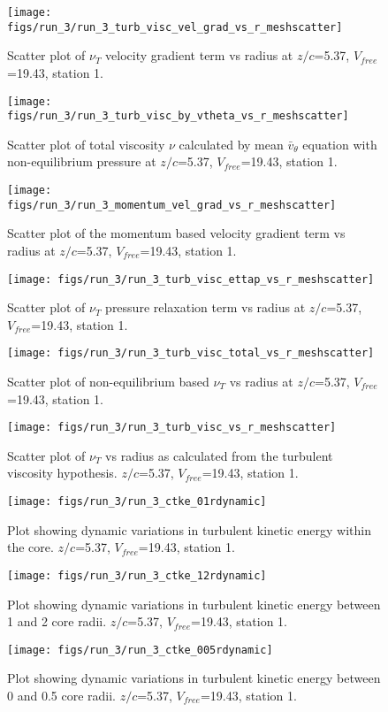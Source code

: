 \begin{figure}[H]
\centering
\texttt{[image: figs/run\_3/run\_3\_turb\_visc\_vel\_grad\_vs\_r\_meshscatter]}
\caption{Scatter plot of $\nu_T$ velocity gradient term vs radius at $z/c$=5.37, $V_{free}$=19.43, station 1.}
\end{figure}


\begin{figure}[H]
\centering
\texttt{[image: figs/run\_3/run\_3\_turb\_visc\_by\_vtheta\_vs\_r\_meshscatter]}
\caption{Scatter plot of total viscosity $\nu$ calculated by mean $\bar{v}_{\theta}$ equation with non-equilibrium pressure at $z/c$=5.37, $V_{free}$=19.43, station 1.}
\end{figure}


\begin{figure}[H]
\centering
\texttt{[image: figs/run\_3/run\_3\_momentum\_vel\_grad\_vs\_r\_meshscatter]}
\caption{Scatter plot of the momentum based velocity gradient term vs radius at $z/c$=5.37, $V_{free}$=19.43, station 1.}
\end{figure}


\begin{figure}[H]
\centering
\texttt{[image: figs/run\_3/run\_3\_turb\_visc\_ettap\_vs\_r\_meshscatter]}
\caption{Scatter plot of $\nu_T$ pressure relaxation term vs radius at $z/c$=5.37, $V_{free}$=19.43, station 1.}
\end{figure}


\begin{figure}[H]
\centering
\texttt{[image: figs/run\_3/run\_3\_turb\_visc\_total\_vs\_r\_meshscatter]}
\caption{Scatter plot of non-equilibrium based $\nu_T$ vs radius at $z/c$=5.37, $V_{free}$=19.43, station 1.}
\end{figure}


\begin{figure}[H]
\centering
\texttt{[image: figs/run\_3/run\_3\_turb\_visc\_vs\_r\_meshscatter]}
\caption{Scatter plot of $\nu_T$ vs radius as calculated from the turbulent viscosity hypothesis. $z/c$=5.37, $V_{free}$=19.43, station 1.}
\end{figure}


\begin{figure}[H]
\centering
\texttt{[image: figs/run\_3/run\_3\_ctke\_01rdynamic]}
\caption{Plot showing dynamic variations in turbulent kinetic energy within the core. $z/c$=5.37, $V_{free}$=19.43, station 1.}
\end{figure}


\begin{figure}[H]
\centering
\texttt{[image: figs/run\_3/run\_3\_ctke\_12rdynamic]}
\caption{Plot showing dynamic variations in turbulent kinetic energy between 1 and 2 core radii. $z/c$=5.37, $V_{free}$=19.43, station 1.}
\end{figure}


\begin{figure}[H]
\centering
\texttt{[image: figs/run\_3/run\_3\_ctke\_005rdynamic]}
\caption{Plot showing dynamic variations in turbulent kinetic energy between 0 and 0.5 core radii. $z/c$=5.37, $V_{free}$=19.43, station 1.}
\end{figure}


